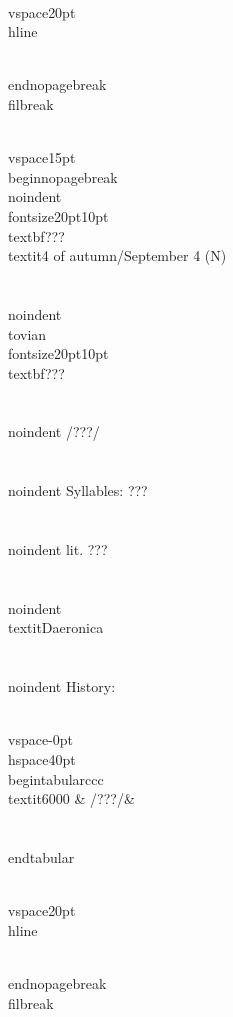 \\vspace{20pt}\\hline

\\end{nopagebreak}
\\filbreak



\\vspace{15pt}
\\begin{nopagebreak}
\\noindent{\\fontsize{20pt}{10pt}\\textbf{???} } \\textit{4 of autumn/September 4} (N)\\\\
\\noindent {\\tovian \\fontsize{20pt}{10pt} \\textbf{???} }\\\\
\\noindent /???/\\\\
\\noindent Syllables: ???\\\\
\\noindent lit. ???\\\\
\\noindent \\textit{Daeronica}\\\\


\\noindent History:

\\vspace{-0pt}
\\hspace{40pt}
\\begin{tabular}{ccc}
\\textit{6000} & /???/& \\\\
\\end{tabular}

\\vspace{20pt}\\hline

\\end{nopagebreak}
\\filbreak



